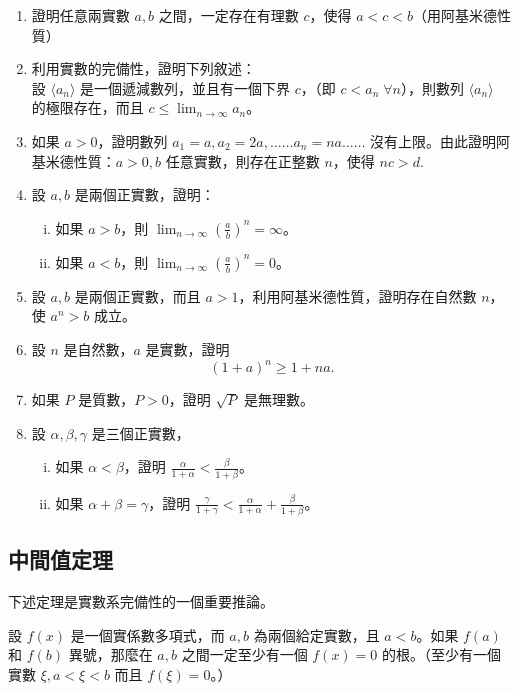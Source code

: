\begin{enumerate}
    \item 證明任意兩實數 $a, b$ 之間，一定存在有理數 $c$，使得 $a < c < b$（用阿基米德性質）
    \item 利用實數的完備性，證明下列敘述：\\
    設 $\langle a_n \rangle$ 是一個遞減數列，並且有一個下界 $c$，（即 $c < a_n\; \forall n$），則數列 $\langle a_n \rangle$ 的極限存在，而且 $c \le \lim_{n\to\infty} a_n$。
    \item 如果 $a>0$，證明數列 $a_1 = a, a_2 = 2a, \dots\dots a_n = na \dots\dots$ 沒有上限。由此證明阿基米德性質：$a>0, b$ 任意實數，則存在正整數 $n$，使得 $nc > d$\label{note:b2-ch3-ex3-3-q3-nc-d}.
    \item 設 $a, b$ 是兩個正實數，證明：
    \begin{enumerate}[(i)]
        \item 如果 $a>b$，則 $\lim_{n\to\infty}\left(\frac{a}{b}\right)^n = \infty$。
        \item 如果 $a<b$，則 $\lim_{n\to\infty}\left(\frac{a}{b}\right)^n = 0$。
    \end{enumerate}
    \item 設 $a, b$ 是兩個正實數，而且 $a>1$，利用阿基米德性質，證明存在自然數 $n$，使 $a^n > b$ 成立。
    \item 設 $n$ 是自然數，$a$ 是實數，證明
    \[
    (1+a)^n \ge 1+na.
    \]
    \item 如果 $P$ 是質數，$P>0$，證明 $\sqrt{P}$ 是無理數。
    \item 設 $\alpha, \beta, \gamma$ 是三個正實數，
    \begin{enumerate}[(i)]
        \item 如果 $\alpha < \beta$，證明 $\frac{\alpha}{1+\alpha} < \frac{\beta}{1+\beta}$。
        \item 如果 $\alpha+\beta = \gamma$，證明 $\frac{\gamma}{1+\gamma} < \frac{\alpha}{1+\alpha} + \frac{\beta}{1+\beta}$。
    \end{enumerate}
\end{enumerate}

\subsection{中間值定理}\label{sec:b2_3-4}

下述定理是實數系完備性的一個重要推論。

\begin{theorem}[多項式函數的中間值定理]
設 $f(x)$ 是一個實係數多項式，而 $a, b$ 為兩個給定實數，且 $a < b$。如果 $f(a)$ 和 $f(b)$ 異號，那麼在 $a, b$ 之間一定至少有一個 $f(x)=0$ 的根。（至少有一個實數 $\xi, a < \xi < b$ 而且 $f(\xi)=0$。）
\end{theorem}


